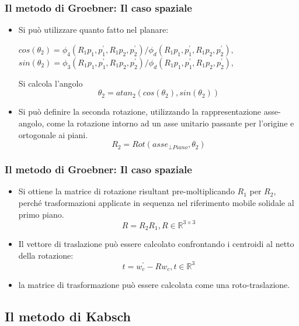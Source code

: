 \documentclass{beamer}
\begin{document}
\begin{frame}
\frametitle{Il metodo di Groebner: Il caso spaziale}
\begin{itemize}
	\item Si può utilizzare quanto fatto nel planare:
	\begin{center}
		$cos(\theta_2) = \phi_4(R_1p_1, p_1^{'}, R_1p_2, p_2^{'})/\phi_d(R_1p_1, p_1^{'}, R_1p_2, p_2^{'}), \,\,$\\
		$sin(\theta_2) = \phi_3(R_1p_1, p_1^{'}, R_1p_2, p_2^{'})/\phi_d(R_1p_1, p_1^{'}, R_1p_2, p_2^{'}),$
	\end{center} 
	Si calcola l'angolo
	\begin{equation}
	\theta_2 = atan_2(cos(\theta_2), sin(\theta_2))
	\end{equation} 
	\item Si può definire la seconda rotazione, utilizzando la rappresentazione asse-angolo, come la rotazione intorno ad un asse unitario passante per l'origine e ortogonale ai piani.
	\begin{equation}
	R_2 = Rot(asse_{\bot Piano}, \theta_2)
	\end{equation} 
\end{itemize}
\end{frame}

\begin{frame}
\frametitle{Il metodo di Groebner: Il caso spaziale}
\begin{itemize}
	\item Si ottiene la matrice di rotazione risultant pre-moltiplicando $R_1$ per $R_2$, perché trasformazioni applicate in sequenza nel riferimento mobile solidale al primo piano.
	\begin{equation}
	R = R_2R_1, R \in \mathbb{R}^{3 \times 3}
	\end{equation}
	\item Il vettore di traslazione può essere calcolato confrontando i centroidi al netto della rotazione:
	\begin{equation}
	t = w_c^{'} - Rw_c, t \in \mathbb{R}^3
	\end{equation}
	\item la matrice di trasformazione può essere calcolata come una roto-traslazione.
\end{itemize}
\end{frame}

\subsection{Il metodo di Kabsch}
\end{document}

